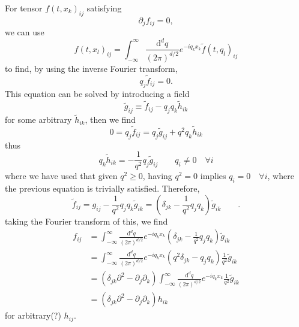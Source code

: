 \documentclass[10pt,a4paper]{article}
\newcommand{\ud}{\mathrm{d}}
\begin{document}
For tensor $f(t,x_k)_{ij}$ satisfying
\begin{equation}
\partial_j f_{ij} = 0		,
\end{equation}
we can use 
\begin{equation}
f(t,x_l)_{ij} = \int_{-\infty}^\infty \frac{\ud^d q}{(2\pi)^{d/2}} e^{-iq_k x_k} \tilde f(t,q_l)_{ij}
\end{equation}
to find, by using the inverse Fourier transform,
\begin{equation}
q_j \tilde f_{ij} = 0		.
\end{equation}
This equation can be solved by introducing a field
\begin{equation}
\tilde g_{ij} \equiv \tilde f_{ij} - q_j q_k \tilde h_{ik}
\end{equation}
for some arbitrary $\tilde h_{ik}$, then we find
\begin{equation}
0 = q_j \tilde f_{ij} = q_j \tilde g_{ij} + q^2q_k \tilde h_{ik}
\end{equation}
thus
\begin{equation}
q_k \tilde h_{ik} = - \frac{1}{q^2} q_j \tilde g_{ij} \qquad q_i \neq 0\quad\forall i
\end{equation}
where we have used that given $q^2 \geq 0$, having $q^2 = 0$ implies $q_i = 0 \quad\forall i$, where the previous equation is trivially satisfied. Therefore,
\begin{equation}
\tilde f_{ij} = g_{ij} - \frac{1}{q^2} q_j q_k \tilde g_{ik} = \left( \delta_{jk} - \frac{1}{q^2} q_j q_k \right) \tilde g_{ik} \qquad .
\end{equation}
taking the Fourier transform of this, we find
\begin{align}
f_{ij} 	& = \int_{-\infty}^\infty \frac{\ud^d q}{(2\pi)^{d/2}} e^{-iq_k x_k} \left( \delta_{jk} - \frac{1}{q^2} q_j q_k \right) \tilde g_{ik}
\\		& = \int_{-\infty}^\infty \frac{\ud^d q}{(2\pi)^{d/2}} e^{-iq_k x_k} \left( q^2 \delta_{jk} - q_j q_k \right) \frac{1}{q^2} \tilde g_{ik}
\\		& = \left( \delta_{jk} \partial^2 - \partial_j \partial_k \right) \int_{-\infty}^\infty \frac{\ud^d q}{(2\pi)^{d/2}} e^{-iq_k x_k}  \frac{1}{q^2} \tilde g_{ik}
\\		& = \left( \delta_{jk} \partial^2 - \partial_j \partial_k \right) h_{ik}
\end{align}
for arbitrary(?) $h_{ij}$.
\end{document}
